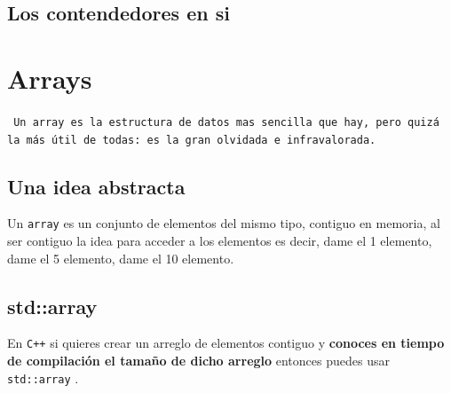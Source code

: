 \documentclass[12pt, fleqn]{report}                             %
\theoremstyle{break}                                            %
\newcommand{\textCode}[1]  { \texttt{#1} }                      %
\newcommand{\Cpp}{\ignorespaces\textCode{C++}}                  %
\begin{document}
        \section{Los contendedores en si}

    \clearpage
    \chapter{Arrays}

        {
            \large
            \textCode{
                Un array es la estructura de datos mas sencilla que hay, pero quizá la más útil
                de todas: es la gran olvidada e infravalorada.
            }
        }

        \clearpage
        \section{Una idea abstracta}

            Un \textCode{array} es un conjunto de elementos del mismo tipo, contiguo en memoria,
            al ser contiguo la idea para acceder a los elementos es decir, dame el 1 elemento, 
            dame el 5 elemento, dame el 10 elemento.



        
        \section{std::array}

            En \Cpp si quieres crear un arreglo de elementos contiguo y \textbf{conoces 
            en tiempo de compilación el tamaño de dicho arreglo} entonces puedes usar
            \textCode{std::array}.

\end{document}

